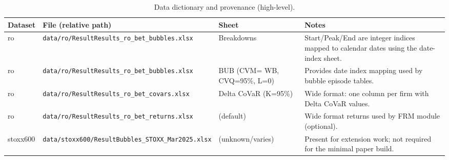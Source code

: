 \begin{table}[ht]
\centering
\small
\begin{tabular}{p{1.2cm} p{5.5cm} p{4.3cm} p{4.5cm}}
\hline
Dataset & File (relative path) & Sheet & Notes \\
\hline
ro & \texttt{data/ro/ResultResults\_ro\_bet\_bubbles.xlsx} & Breakdowns & Start/Peak/End are integer indices mapped to calendar dates using the date-index sheet. \\
ro & \texttt{data/ro/ResultResults\_ro\_bet\_bubbles.xlsx} & BUB (CVM= WB, CVQ=95\%, L=0) & Provides date index mapping used by bubble episode tables. \\
ro & \texttt{data/ro/ResultResults\_ro\_bet\_covars.xlsx} & Delta CoVaR (K=95\%) & Wide format: one column per firm with Delta CoVaR values. \\
ro & \texttt{data/ro/ResultResults\_ro\_bet\_returns.xlsx} & (default) & Wide format returns used by FRM module (optional). \\
stoxx600 & \texttt{data/stoxx600/ResultBubbles\_STOXX\_Mar2025.xlsx} & (unknown/varies) & Present for extension work; not required for the minimal paper build. \\
\hline
\end{tabular}
\caption{Data dictionary and provenance (high-level).}
\label{tab:data_dictionary}
\end{table}
